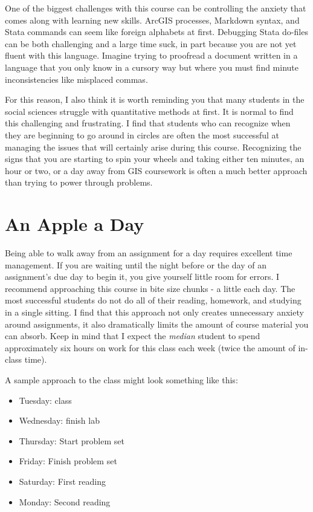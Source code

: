 \documentclass[]{book}
\providecommand{\tightlist}{%
  \setlength{\itemsep}{0pt}\setlength{\parskip}{0pt}}
\theoremstyle{definition}
\theoremstyle{definition}
\theoremstyle{remark}
\begin{document}
One of the biggest challenges with this course can be controlling the
anxiety that comes along with learning new skills. ArcGIS processes,
Markdown syntax, and Stata commands can seem like foreign alphabets at
first. Debugging Stata do-files can be both challenging and a large time
suck, in part because you are not yet fluent with this language. Imagine
trying to proofread a document written in a language that you only know
in a cursory way but where you must find minute inconsistencies like
misplaced commas.

For this reason, I also think it is worth reminding you that many
students in the social sciences struggle with quantitative methods at
first. It is normal to find this challenging and frustrating. I find
that students who can recognize when they are beginning to go around in
circles are often the most successful at managing the issues that will
certainly arise during this course. Recognizing the signs that you are
starting to spin your wheels and taking either ten minutes, an hour or
two, or a day away from GIS coursework is often a much better approach
than trying to power through problems.

\section{An Apple a Day}\label{an-apple-a-day}

Being able to walk away from an assignment for a day requires excellent
time management. If you are waiting until the night before or the day of
an assignment's due day to begin it, you give yourself little room for
errors. I recommend approaching this course in bite size chunks - a
little each day. The most successful students do not do all of their
reading, homework, and studying in a single sitting. I find that this
approach not only creates unnecessary anxiety around assignments, it
also dramatically limits the amount of course material you can absorb.
Keep in mind that I expect the \emph{median} student to spend
approximately six hours on work for this class each week (twice the
amount of in-class time).

A sample approach to the class might look something like this:

\begin{itemize}
\tightlist
\item
  Tuesday: class
\item
  Wednesday: finish lab
\item
  Thursday: Start problem set
\item
  Friday: Finish problem set
\item
  Saturday: First reading
\item
  Monday: Second reading
\end{itemize}
\end{document}
